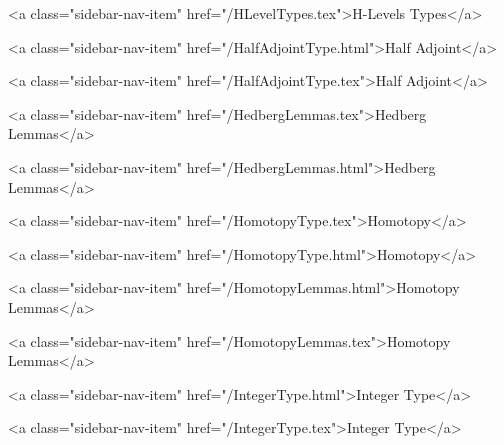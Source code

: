       
        
          <a class="sidebar-nav-item" href="/HLevelTypes.tex">H-Levels Types</a>
        
      
    
      
        
          <a class="sidebar-nav-item" href="/HalfAdjointType.html">Half Adjoint</a>
        
      
    
      
        
          <a class="sidebar-nav-item" href="/HalfAdjointType.tex">Half Adjoint</a>
        
      
    
      
        
          <a class="sidebar-nav-item" href="/HedbergLemmas.tex">Hedberg Lemmas</a>
        
      
    
      
        
          <a class="sidebar-nav-item" href="/HedbergLemmas.html">Hedberg Lemmas</a>
        
      
    
      
        
          <a class="sidebar-nav-item" href="/HomotopyType.tex">Homotopy</a>
        
      
    
      
        
          <a class="sidebar-nav-item" href="/HomotopyType.html">Homotopy</a>
        
      
    
      
        
          <a class="sidebar-nav-item" href="/HomotopyLemmas.html">Homotopy Lemmas</a>
        
      
    
      
        
          <a class="sidebar-nav-item" href="/HomotopyLemmas.tex">Homotopy Lemmas</a>
        
      
    
      
        
          <a class="sidebar-nav-item" href="/IntegerType.html">Integer Type</a>
        
      
    
      
        
          <a class="sidebar-nav-item" href="/IntegerType.tex">Integer Type</a>
        
      
    
